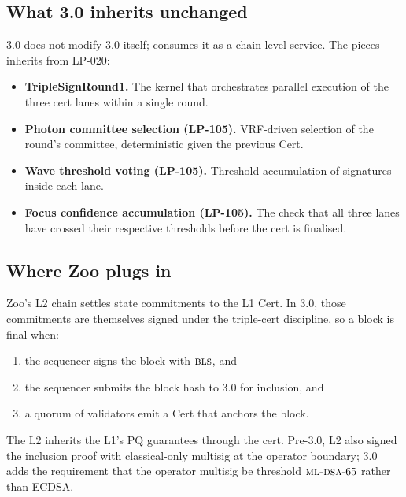 \subsection{What 3.0 inherits unchanged}

\Zoo{} 3.0 does not modify \Quasar{} 3.0 itself; \Zoo{} consumes it
as a chain-level service. The pieces \Zoo{} inherits from LP-020:

\begin{itemize}[leftmargin=1.2em]
  \item \textbf{TripleSignRound1.} The kernel that orchestrates parallel
        execution of the three cert lanes within a single round.
  \item \textbf{Photon committee selection (LP-105).} VRF-driven
        selection of the round's committee, deterministic given
        the previous \Quasar{}Cert.
  \item \textbf{Wave threshold voting (LP-105).} Threshold accumulation
        of signatures inside each lane.
  \item \textbf{Focus confidence accumulation (LP-105).} The check that
        all three lanes have crossed their respective thresholds before
        the cert is finalised.
\end{itemize}

\subsection{Where Zoo plugs in}

Zoo's L2 chain settles state commitments to the L1 \Quasar{}Cert. In
3.0, those commitments are themselves signed under the triple-cert
discipline, so a \Zoo{} block is final when:

\begin{enumerate}[leftmargin=1.4em]
  \item the \Zoo{} sequencer signs the block with $\textsc{bls}{}$, and
  \item the \Zoo{} sequencer submits the block hash to \Lux{}
        \Quasar{} 3.0 for inclusion, and
  \item a quorum of \Lux{} validators emit a \Quasar{}Cert that
        anchors the \Zoo{} block.
\end{enumerate}

The L2 inherits the L1's PQ guarantees through the cert. Pre-3.0,
\Zoo{} L2 also signed the inclusion proof with classical-only
multisig at the operator boundary; 3.0 adds the requirement that
the operator multisig be threshold $\textsc{ml-dsa}{}\text{-}65$ rather than
ECDSA.

